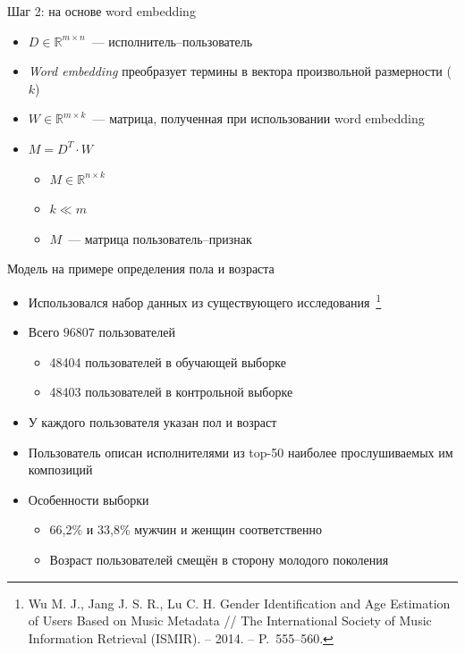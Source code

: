 \documentclass{beamer}
\begin{document}
\begin{frame}{Шаг 2: на основе word embedding}
  \begin{itemize}
      \item {$D \in \mathbb{R}^{m \times n}$~--- исполнитель--пользователь}
      \item {\textit{Word embedding} преобразует термины в вектора произвольной размерности ($k$)}
      \item {$W \in \mathbb{R}^{m \times k}$~--- матрица, полученная при использовании word embedding}
      \item {$M = D^T \cdot W$}
      \begin{itemize}
          \item {$M \in \mathbb{R}^{n \times k}$}
          \item {$k \ll m$}
          \item {$M$~--- матрица пользователь--признак}
      \end{itemize}
  \end{itemize}
\end{frame}

\begin{frame}{Модель на примере определения пола и возраста}
    \begin{itemize}
        \item {Использовался набор данных из существующего 
              исследования~\footnote{Wu M. J.,
              Jang J. S. R., Lu C. H. Gender Identification
              and Age Estimation of Users Based on Music 
              Metadata // The International Society of Music Information Retrieval (ISMIR). – 2014. – P.~555--560.}}
        \item {Всего $96807$ пользователей}
            \begin{itemize}
                \item {48404 пользователей в обучающей выборке}
                \item {48403 пользователей в контрольной выборке}
            \end{itemize}
        \item {У каждого пользователя указан пол и возраст}
        \item {Пользователь описан исполнителями из top-50 наиболее
            прослушиваемых им композиций}
        \item {Особенности выборки}
            \begin{itemize}
                \item {66{,}2\% и 33{,}8\% мужчин и женщин соответственно}
                \item {Возраст пользователей смещён в сторону молодого поколения}
            \end{itemize}
    \end{itemize}
\end{frame}
\end{document}
